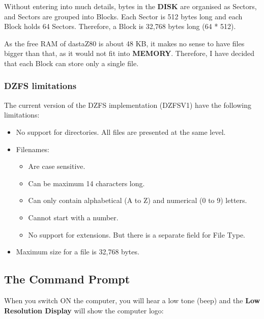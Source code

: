 \documentclass[a4paper,11pt]{article}
\begin{document}
    Without entering into much details, bytes in the \textbf{DISK} are organised
    as Sectors, and Sectors are grouped into Blocks. Each Sector is 512 bytes
    long and each Block holds 64 Sectors. Therefore, a Block is 32,768 bytes
    long (64 * 512).

    As the free RAM of dastaZ80 is about 48 KB, it makes no sense to have files
    bigger than that, as it would not fit into \textbf{MEMORY}. Therefore, I
    have decided that each Block can store only a single file.

    \subsubsection{DZFS limitations}
    The current version of the DZFS implementation (DZFSV1) have the following
    limitations:

    \begin{itemize}
        \item No support for directories. All files are presented at the same
        level.
        \item Filenames:
        \begin{itemize}
            \item Are case sensitive.
            \item Can be maximum 14 characters long.
            \item Can only contain alphabetical (A to Z) and numerical (0 to 9)
            letters.
            \item Cannot start with a number.
            \item No support for extensions. But there is a separate field for
            File Type.
        \end{itemize}
        \item Maximum size for a file is 32,768 bytes.
    \end{itemize}
        
    \pagebreak
    \subsection{The Command Prompt}
    When you switch ON the computer, you will hear a low tone (beep) and the
    \textbf{Low Resolution Display} will show the computer logo:
\end{document}
